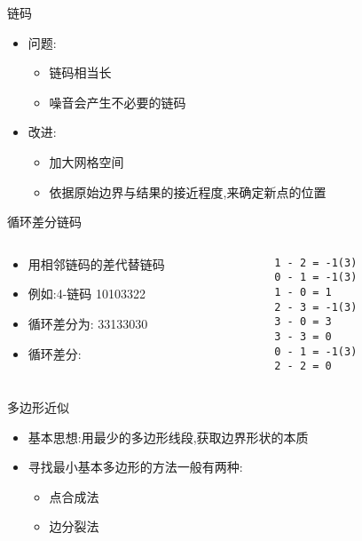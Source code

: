 \documentclass[presentation]{beamer}
\begin{document}
\begin{frame}[label={sec:org7a7f921}]{链码}
\begin{itemize}
\item 问题:
\begin{itemize}
\item 链码相当长
\item 噪音会产生不必要的链码
\end{itemize}
\item 改进:
\begin{itemize}
\item 加大网格空间
\item 依据原始边界与结果的接近程度,来确定新点的位置
\end{itemize}
\end{itemize}
\end{frame}

\begin{frame}[label={sec:org5b34b05},fragile]{循环差分链码}
 \begin{columns}
\begin{column}{0.5\columnwidth}
\begin{itemize}
\item 用相邻链码的差代替链码
\item 例如:4-链码 10103322
\item 循环差分为: 33133030
\item 循环差分:
\end{itemize}
\end{column}
\begin{column}{0.45\columnwidth}
\begin{verbatim}
1 - 2 = -1(3) 
0 - 1 = -1(3) 
1 - 0 = 1
2 - 3 = -1(3)
3 - 0 = 3
3 - 3 = 0
0 - 1 = -1(3)
2 - 2 = 0
\end{verbatim}
\end{column}
\end{columns}
\end{frame}

\begin{frame}[label={sec:orgf0e0f9f}]{多边形近似}
\begin{itemize}
\item 基本思想:用最少的多边形线段,获取边界形状的本质
\item 寻找最小基本多边形的方法一般有两种:
\begin{itemize}
\item 点合成法
\item 边分裂法
\end{itemize}
\end{itemize}
\end{frame}
\end{document}
